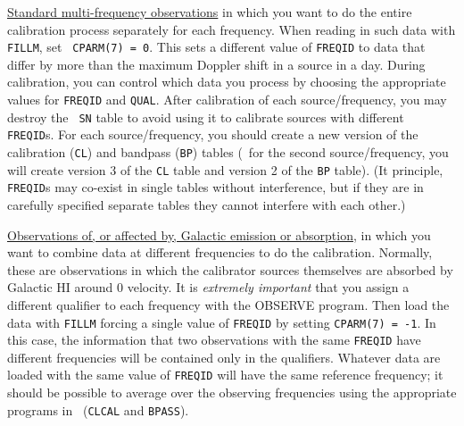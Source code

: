 \xben
\Item \underline{Standard multi-frequency observations} in which you
want to do the entire calibration process separately for each
frequency.  When reading in such data with {\tt FILLM}, set {\tt
CPARM(7) = 0}.  This sets a different value of {\tt FREQID} to data
that differ by more than the maximum Doppler shift in a source in a
day.  During calibration, you can control which data you process by
choosing the appropriate values for {\tt FREQID} and {\tt QUAL}\@.
After calibration of each source/frequency, you may destroy the {\tt
SN} table to avoid using it to calibrate sources with different {\tt
FREQID}s.  For each source/frequency, you should create a new version
of the calibration ({\tt CL}) and bandpass ({\tt BP}) tables (\eg\ for
the second source/frequency, you will create version 3 of the {\tt CL}
table and version 2 of the {\tt BP} table).  (It principle, {\tt
FREQID}s may co-exist in single tables without interference, but if
they are in carefully specified separate tables they cannot interfere
with each other.)

\Item \underline{Observations of, or affected by, Galactic emission or
absorption}, in which you want to combine data at different
frequencies to do the calibration.  Normally, these are observations
in which the calibrator sources themselves are absorbed by Galactic HI
around 0 velocity.  It is {\em extremely important} that you assign a
different qualifier to each frequency with the OBSERVE program.  Then
load the data with {\tt FILLM} forcing a single value of {\tt FREQID}
by setting {\tt CPARM(7) = -1}.  In this case, the information that
two observations with the same {\tt FREQID} have different frequencies
will be contained only in the qualifiers.  Whatever data are loaded
with the same value of {\tt FREQID} will have the same reference
frequency; it should be possible to average over the observing
frequencies using the appropriate programs in \AIPS\ ({\tt CLCAL} and
{\tt BPASS}).

\xeen



\bre
{}
\ere

